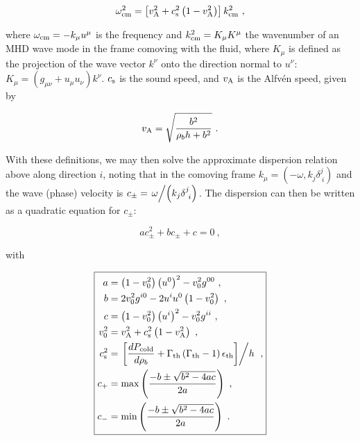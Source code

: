 \documentclass[landscape,letterpaper,10pt,english]{article}
\begin{document}
\[
\omega_{\rm cm}^{2} = \left[v_{\rm A}^{2} + c_{\rm s}^{2}\left(1-v_{\rm A}^{2}\right)\right]k_{\rm cm}^{2}\ ,
\]

where \(\omega_{\rm cm}=-k_{\mu}u^{\mu}\) is the frequency and
\(k_{\rm cm}^{2} = K_{\mu}K^{\mu}\) the wavenumber of an MHD wave mode
in the frame comoving with the fluid, where \(K_{\mu}\) is defined as
the projection of the wave vector \(k^{\nu}\) onto the direction normal
to \(u^{\nu}\):
\(K_{\mu} = \left(g_{\mu\nu}+u_{\mu}u_{\nu}\right)k^{\nu}\).
\(c_{\rm s}\) is the sound speed, and \(v_{\rm A}\) is the Alfvén speed,
given by

\[
v_{\rm A} = \sqrt{\frac{b^{2}}{\rho_{b}h + b^{2}}}\ .
\]

With these definitions, we may then solve the approximate dispersion
relation above along direction \(i\), noting that in the comoving frame
\(k_{\mu} = \left(-\omega,k_{j}\delta^{j}_{\ i}\right)\) and the wave
(phase) velocity is
\(c_{\pm} = \left.\omega\middle/\left(k_{j}\delta^{j}_{\ i}\right)\right.\).
The dispersion can then be written as a quadratic equation for
\(c_{\pm}\):

\[
ac_{\pm}^{2} + bc_{\pm} + c = 0\ ,
\]

with

\[
\boxed{
\begin{align}
a &= \left(1-v_{0}^{2}\right)\left(u^{0}\right)^{2} - v_{0}^{2}g^{00}\ ,\\
b &= 2v_{0}^{2}g^{i0} - 2u^{i}u^{0}\left(1-v^{2}_{0}\right)\ ,\\
c &= \left(1-v_{0}^{2}\right)\left(u^{i}\right)^{2} - v_{0}^{2}g^{ii}\ ,\\
v_{0}^{2} &= v_{\rm A}^{2} + c_{\rm s}^{2}\left(1-v_{\rm A}^{2}\right)\ ,\\
c_{\rm s}^{2} &= \left.\left[\frac{dP_{\rm cold}}{d\rho_{b}} + \Gamma_{\rm th}\left(\Gamma_{\rm th}-1\right)\epsilon_{\rm th}\right]\middle/h\right.\ ,\\
c_{+} &= \max\left(\frac{-b \pm \sqrt{b^{2}-4ac}}{2a}\right)\ ,\\
c_{-} &= \min\left(\frac{-b \pm \sqrt{b^{2}-4ac}}{2a}\right)\ .
\end{align}
}
\]
\end{document}
